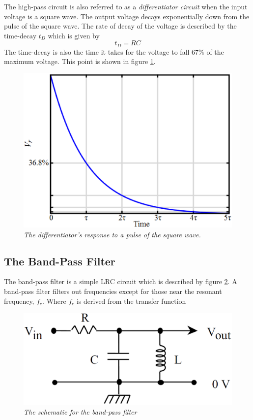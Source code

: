 \documentclass[11pt]{article}
\numberwithin{equation}{section}
\numberwithin{figure}{section}
\numberwithin{table}{section}
\begin{document}
The high-pass circuit is also referred to as a \emph{differentiator circuit} when the input voltage is a square wave. The output voltage decays exponentially down from the pulse of the square wave. The rate of decay of the voltage is described by the time-decay $t_D$ which is given by
\begin{equation}
t_D = RC
\label{TimeDecay}
\end{equation} The time-decay is also the time it takes for the voltage to fall $67\%$ of the maximum voltage. This point is shown in figure \ref{Differ}.
\begin{figure}[h]
\centering
\includegraphics[scale=0.40]{Differ.eps}
\caption{\textit{The differentiator's response to a pulse of the square wave.}}
\label{Differ}
\end{figure}

\subsection{The Band-Pass Filter}
The band-pass filter is a simple LRC circuit which is described by figure \ref{FigBandPass}. A band-pass filter filters out frequencies except for those near the resonant frequency, $f_c$. Where $f_c$ is derived from the transfer function

\begin{figure}[h]
\centering
\includegraphics[scale=0.20]{BandPass.eps}
\caption{\textit{The schematic for the band-pass filter}}
\label{FigBandPass}
\end{figure}
\end{document}
